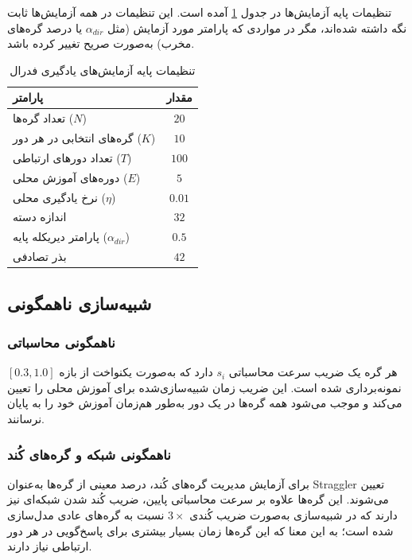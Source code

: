 تنظیمات پایه آزمایش‌ها در جدول \ref{tab:fl_settings} آمده است. این تنظیمات در همه آزمایش‌ها ثابت نگه داشته شده‌اند، مگر در مواردی که پارامتر مورد آزمایش (مثل $\alpha_{dir}$ یا درصد گره‌های مخرب) به‌صورت صریح تغییر کرده باشد.

\begin{table}[t]
    \centering
    \renewcommand{\arraystretch}{1.8}
    \caption{تنظیمات پایه آزمایش‌های یادگیری فدرال}
    \label{tab:fl_settings}
    \begin{tabular}{lc}
        \toprule
        \textbf{پارامتر} & \textbf{مقدار} \\
        \midrule
        تعداد گره‌ها ($N$) & $20$ \\
        گره‌های انتخابی در هر دور ($K$) & $10$ \\
        تعداد دورهای ارتباطی ($T$) & $100$ \\
        دوره‌های آموزش محلی ($E$) & $5$ \\
        نرخ یادگیری محلی ($\eta$) & $0.01$ \\
        اندازه دسته & $32$ \\
        پارامتر دیریکله پایه ($\alpha_{dir}$) & $0.5$ \\
        بذر تصادفی & $42$ \\
        \bottomrule
    \end{tabular}
\end{table}

\subsection{شبیه‌سازی ناهمگونی}

\subsubsection{ناهمگونی محاسباتی}

هر گره یک ضریب سرعت محاسباتی $s_i$ دارد که به‌صورت یکنواخت از بازه $[0.3, 1.0]$ نمونه‌برداری شده است. این ضریب زمان شبیه‌سازی‌شده برای آموزش محلی را تعیین می‌کند و موجب می‌شود همه گره‌ها در یک دور به‌طور هم‌زمان آموزش خود را به پایان نرسانند.

\subsubsection{ناهمگونی شبکه و گره‌های کُند}

برای آزمایش مدیریت گره‌های کُند، درصد معینی از گره‌ها به‌عنوان \gls{Straggler} تعیین می‌شوند. این گره‌ها علاوه بر سرعت محاسباتی پایین، ضریب کُند شدن شبکه‌ای نیز دارند که در شبیه‌سازی به‌صورت ضریب کُندی $3\times$ نسبت به گره‌های عادی مدل‌سازی شده است؛ به این معنا که این گره‌ها زمان بسیار بیشتری برای پاسخ‌گویی در هر دور ارتباطی نیاز دارند.


